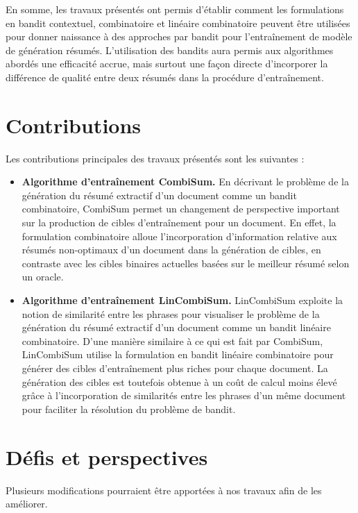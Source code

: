 En somme, les travaux présentés ont permis d'établir comment les formulations en bandit 
contextuel, combinatoire et linéaire combinatoire peuvent être utilisées 
pour donner naissance à des approches par bandit pour l'entraînement 
de modèle de génération résumés.
L'utilisation des bandits aura permis aux algorithmes abordés une efficacité accrue,
mais surtout une façon directe d'incorporer la différence de qualité entre 
deux résumés dans la procédure d'entraînement.

\section*{Contributions}

Les contributions principales des travaux présentés sont les suivantes :

\begin{itemize}
    \item \textbf{Algorithme d'entraînement CombiSum.}
    En décrivant le problème de la génération du résumé extractif d'un 
    document comme un bandit combinatoire, CombiSum permet un changement de perspective
    important sur la production de cibles d'entraînement pour un document.
    En effet, la formulation combinatoire alloue l'incorporation d'information 
    relative aux résumés non-optimaux d'un document dans la génération de cibles,
    en contraste avec les cibles binaires actuelles basées sur le meilleur résumé selon un oracle.
    \item \textbf{Algorithme d'entraînement LinCombiSum.}
    LinCombiSum exploite la notion de similarité entre les phrases pour visualiser 
    le problème de la génération du résumé extractif d'un document comme un bandit 
    linéaire combinatoire.
    D'une manière similaire à ce qui est fait par CombiSum, LinCombiSum utilise 
    la formulation en bandit linéaire combinatoire pour générer des cibles d'entraînement
    plus riches pour chaque document.
    La génération des cibles est toutefois obtenue à un coût de calcul moins 
    élevé grâce à l'incorporation de similarités entre les phrases d'un même 
    document pour faciliter la résolution du problème de bandit.
\end{itemize}

\section*{Défis et perspectives}

Plusieurs modifications pourraient être apportées à nos travaux afin 
de les améliorer.

